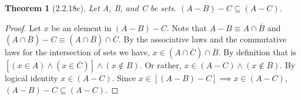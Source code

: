 \documentclass[a4paper, 12pt]{article}
\theoremstyle{plain}
\newtheorem*{theorem*}{Theorem}
\begin{document}
	
	\begin{theorem*}[2.2.18c]
		Let A, B, and C be sets. $(A - B) - C \subseteq (A - C)$.
	\end{theorem*}
	
	\begin{proof}
		Let $x$ be an element in $(A - B) - C$. Note that $A - B \equiv A \cap \overline{B}$ and $(A \cap \overline{B}) - C \equiv (A \cap \overline{B}) \cap \overline{C}$. By the associative laws and the commutative laws for the intersection of sets we have, $x \in (A \cap \overline{C}) \cap \overline{B}$. By definition that is $[(x \in A) \land (x \in \overline{C})] \land (x \notin B)$. Or rather, $x \in (A - C) \land (x \notin B)$. By logical identity $x \in (A - C)$. Since $x \in [(A - B) - C] \implies x \in (A - C)$, $(A - B) - C \subseteq (A - C)$.
	\end{proof}
\end{document}
